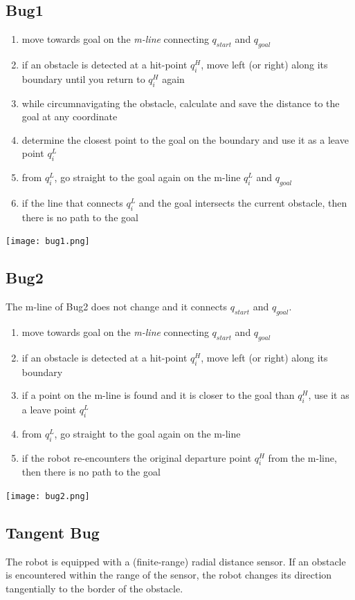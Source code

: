\begin{multicols*}{2}
\subsection{Bug1}
\begin{enumerate}
	\item move towards goal on the \textit{m-line} connecting $q_{start}$ and $q_{goal}$
	\item if an obstacle is detected at a hit-point $q^H_i$, move left (or right) along its boundary until you return to $q^H_i$ again
	\item while circumnavigating the obstacle, calculate and save the distance to the goal at any coordinate
	\item determine the closest point to the goal on the boundary and use it as a leave point $q^L_i$
	\item from $q^L_i$, go straight to the goal again on the m-line $q^L_i$ and $q_{goal}$
	\item if the line that connects $q^L_i$ and the goal intersects the current obstacle, then there is no path to the goal
\end{enumerate}
\texttt{[image: bug1.png]}



\subsection{Bug2}
The m-line of Bug2 does not change and it connects $q_{start}$ and $q_{goal}$.
\begin{enumerate}
	\item move towards goal on the \textit{m-line} connecting $q_{start}$ and $q_{goal}$
	\item if an obstacle is detected at a hit-point $q^H_i$, move left (or right) along its boundary
	\item if a point on the m-line is found and it is closer to the goal than $q^H_i$, use it as a leave point $q^L_i$
	\item from $q^L_i$, go straight to the goal again on the m-line
	\item if the robot re-encounters the original departure point $q^H_i$ from the m-line, then there is no path to the goal
\end{enumerate}
\texttt{[image: bug2.png]}

\subsection{Tangent Bug}
The robot is equipped with a (finite-range) radial distance sensor. If an obstacle is encountered within the range of the sensor, the robot changes its direction tangentially to the border of the obstacle.


\end{multicols*}
